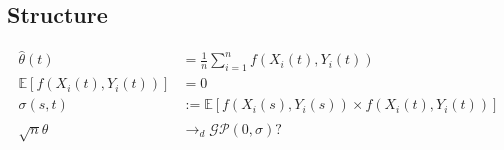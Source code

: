 \newpage

\subsection{Structure}

\begin{align}
    \hat{\theta}(t) &= \frac{1}{n} \sum_{i = 1}^n f(X_i(t), Y_i(t))\\
    \mathbb{E}[f(X_i(t), Y_i(t))] &= 0\\
    \sigma(s, t) &:= \mathbb{E}[f(X_i(s), Y_i(s)) \times f(X_i(t), Y_i(t))]\\
    \sqrt{n} \hat{\theta} &\to_d \mathcal{GP}(0, \sigma) ?
\end{align}
